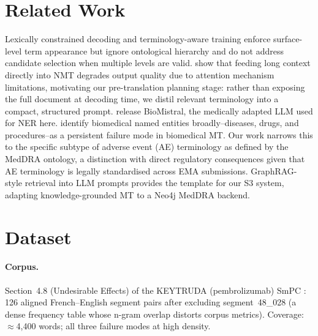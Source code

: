\documentclass[11pt,a4paper,twocolumn]{article}
\begin{document}
\section{Related Work}
\label{sec:related}

Lexically constrained decoding \citep{hokamp2017lexically,post2018fast} and
terminology-aware training \citep{dinu2019training} enforce surface-level term
appearance but ignore ontological hierarchy and do not address candidate
selection when multiple levels are valid. \citet{herold2023improving} show that feeding long context directly into NMT
degrades output quality due to attention mechanism limitations, motivating our
pre-translation planning stage: rather than exposing the full document at decoding
time, we distil relevant terminology into a compact, structured prompt. \citet{labrak2024biomistral} release
BioMistral, the medically adapted LLM used for NER here.
\citet{neves2022evaluation} identify biomedical named entities broadly--diseases,
drugs, and procedures--as a persistent failure mode in biomedical MT. Our work
narrows this to the specific subtype of adverse event (AE) terminology as defined
by the MedDRA ontology, a distinction with direct regulatory consequences given
that AE terminology is legally standardised across EMA submissions. GraphRAG-style retrieval
\citep{edge2024local} into LLM prompts provides the template for our S3
system, adapting knowledge-grounded MT \citep{moussallem2019augmenting} to
a Neo4j MedDRA backend.

\section{Dataset}
\label{sec:data}

\paragraph{Corpus.}
Section~4.8 (Undesirable Effects) of the KEYTRUDA (pembrolizumab) SmPC
\citep{ema2024keytruda}: 126 aligned French--English segment pairs after
excluding segment~48\_028 (a dense frequency table whose n-gram overlap
distorts corpus metrics). Coverage: $\approx$4,400 words; all three failure
modes at high density.
\end{document}

